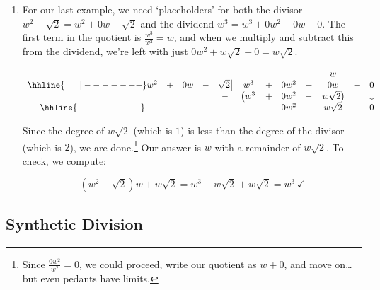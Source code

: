 \begin{exampleSol}
\begin{enumerate}
Our answer is $3y - \frac{15}{2}$ with a remainder of $\frac{73}{2}$.  To check our answer, we compute:

\[ (2y + 5)\left(3y - \dfrac{15}{2}\right) + \dfrac{73}{2} = 6y^2 - 15y + 15y - \dfrac{75}{2} + \dfrac{73}{2} = 6y^2 - 1 \, \checkmark\]


\item For our last example, we need `placeholders' for both the divisor  $w^2 - \sqrt{2} = w^2 + 0w -\sqrt{2}$ and the dividend $w^3 = w^3 + 0w^2 + 0w + 0$.  The first term in the quotient is $\frac{w^3}{w^2} = w$, and when we multiply and subtract this from the dividend, we're left with just $0w^2 + w\sqrt{2} + 0 = w\sqrt{2}$.

\setlength\arraycolsep{0.1pt}
\setlength\extrarowheight{2pt}

\[ \begin{array}{cccccccccccc}
    &   &    &   &                    &     &   &      &   &  w &   & \\ \hhline{~~~~~|-------}
w^2 & + & 0w & - & \sqrt{2} \, \vline & w^3 & + & 0w^2 & + & 0w & + & 0  \\
		&   &    &    &                  -&\left(w^3\vphantom{w\sqrt{2}} \right. & + & 0w^2 & - & \left.  w\sqrt{2} \right) & & \downarrow \\ \hhline{~~~~~-----~~}
    &   &    &    &                   &                                       &  &  0w^2     &  + &   w\sqrt{2}  & + & 0\\ 
\end{array}\]
\setlength\arraycolsep{5pt}
\setlength\extrarowheight{0pt}

Since the degree of $w\sqrt{2}$ (which is $1$) is less than the degree of the divisor (which is $2$), we are done.\footnote{Since $\frac{0w^2}{w^2} = 0$, we could proceed, write our quotient as $w+0$, and move on\ldots but even pedants have limits.}  Our answer is $w$ with a remainder of $w \sqrt{2}$.  To check, we compute:

\[ \left(w^2 - \sqrt{2}\right)w + w\sqrt{2} = w^3 - w\sqrt{2} + w\sqrt{2} = w^3 \, \checkmark\]

\vspace{-0.3in}  

\end{enumerate}

\end{exampleSol}


\subsection{Synthetic Division}

